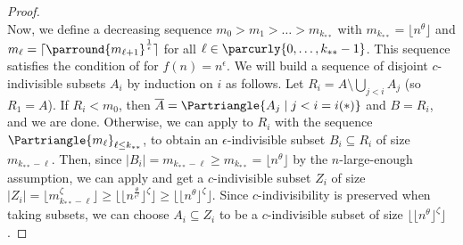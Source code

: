 \begin{theorem}[Theorem 4.23]
\begin{proof}
\[            \]
            Now, we define a decreasing sequence $m_0 > m_1 > \dots > m_{k_{**}}$ with $m_{k_{**}} = \lfloor n^\theta \rfloor$
            and $m_{\ell} = \lceil \parround{m_{\ell+1}}^{\frac{1}{\epsilon}} \rceil$ for all $\ell \in \parcurly{0, \dots, k_{**}-1}$.
            This sequence satisfies the condition of  for $f(n) = n^\epsilon$.
            We will build a sequence of disjoint $c$-indivisible subsets $A_i$ by induction on $i$ as follows.
            Let $R_i = A \setminus \bigcup_{j<i} A_j$ (so $R_1 = A$).
            If $R_i < m_0$, then
            $\overline{A} = \Partriangle{A_j \mid j < i = i(*)}$ and $B = R_i$, and we are done.
            Otherwise, we can apply  to $R_i$ with the sequence
            $\Partriangle{m_\ell}_{\ell \leq k_{**}}$, to obtain an $\epsilon$-indivisible subset $B_i \subseteq R_i$ of
            size $m_{k_{**}-\ell}$.
            Then, since $|B_i| = m_{k_{**}-\ell} \geq m_{k_{**}} = \lfloor n^\theta \rfloor$ by the $n$-large-enough assumption,
            we can apply  and get a
            $c$-indivisible subset $Z_i$ of size $|Z_i| = \lfloor m_{k_{**}-\ell}^\zeta \rfloor
            \geq \lfloor \lfloor n^{\frac{\theta}{\epsilon^\ell}} \rfloor ^\zeta \rfloor
            \geq \lfloor \lfloor n^{\theta} \rfloor ^\zeta \rfloor$.
            Since $c$-indivisibility is preserved when taking subsets,
            we can choose $A_i \subseteq Z_i$ to be a $c$-indivisible subset of size $\lfloor \lfloor n^{\theta} \rfloor ^\zeta \rfloor$.
        \end{proof}
    \end{theorem}


